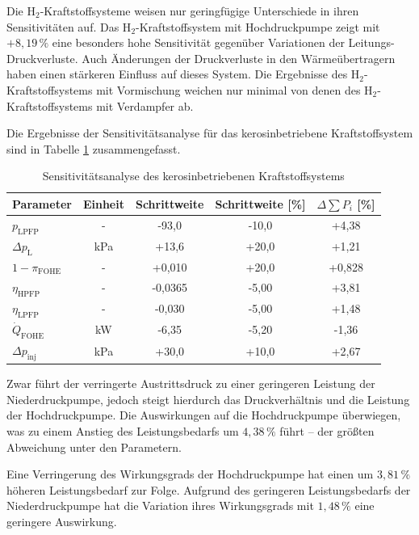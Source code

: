 Die H$_2$-Kraftstoffsysteme weisen nur geringfügige Unterschiede in ihren Sensitivitäten auf. Das H$_2$-Kraftstoffsystem mit Hochdruckpumpe zeigt mit $+8,19\,\%$ eine besonders hohe Sensitivität gegenüber Variationen der Leitungs-Druckverluste. Auch Änderungen der Druckverluste in den Wärmeübertragern haben einen stärkeren Einfluss auf dieses System. Die Ergebnisse des H$_2$-Kraftstoffsystems mit Vormischung weichen nur minimal von denen des H$_2$-Kraftstoffsystems mit Verdampfer ab.

Die Ergebnisse der Sensitivitätsanalyse für das kerosinbetriebene Kraftstoffsystem sind in Tabelle \ref{Tab:sensjeta} zusammengefasst.

\begin{table}[ht]
	\centering
	\caption{Sensitivitätsanalyse des kerosinbetriebenen Kraftstoffsystems}
	\begin{tabular} {|l|c|c|c|c|} \hline%
		Parameter & Einheit & Schrittweite & Schrittweite [\%] & $ \Delta \sum P_i$ [\%] \\ \hline\hline%
		$p_\mathrm{LPFP}$ & - & -93,0 & -10,0 & +4,38 \\ \hline 
		$\Delta p_\mathrm{L}$ & \si{\kilo\Pa} & +13,6 & +20,0 & +1,21 \\ \hline 
		$1-\pi_\mathrm{FOHE}$ & - & +0,010 & +20,0 & +0,828 \\ \hline 
		$\eta_\mathrm{HPFP}$ & - & -0,0365 & -5,00 & +3,81 \\ \hline 
		$\eta_\mathrm{LPFP}$ & - & -0,030 & -5,00 & +1,48 \\ \hline 
		$\dot{Q}_\mathrm{FOHE}$ & \si{\kilo\W} & -6,35 & -5,20 & -1,36 \\ \hline 
		$\Delta p_\mathrm{inj}$ & \si{\kilo\Pa} & +30,0 & +10,0 & +2,67 \\ \hline 
	\end{tabular}	
	\label{Tab:sensjeta}%
\end{table}
\FloatBarrier 

Zwar führt der verringerte Austrittsdruck zu einer geringeren Leistung der Niederdruckpumpe, jedoch steigt hierdurch das Druckverhältnis und die Leistung der Hochdruckpumpe. Die Auswirkungen auf die Hochdruckpumpe überwiegen, was zu einem Anstieg des Leistungsbedarfs um $4,38\,\%$ führt – der größten Abweichung unter den Parametern. 

Eine Verringerung des Wirkungsgrads der Hochdruckpumpe hat einen um $3,81\,\%$ höheren Leistungsbedarf zur Folge. Aufgrund des geringeren Leistungsbedarfs der Niederdruckpumpe hat die Variation ihres Wirkungsgrads mit $1,48\,\%$ eine geringere Auswirkung. 

